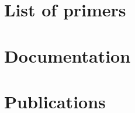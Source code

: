 \chapter{List of primers}
  \label{app:primers}

\chapter{Documentation}
  \label{app:pod-doc}
  

\chapter{Publications}
  \label{app:h2ax-review}
%  

